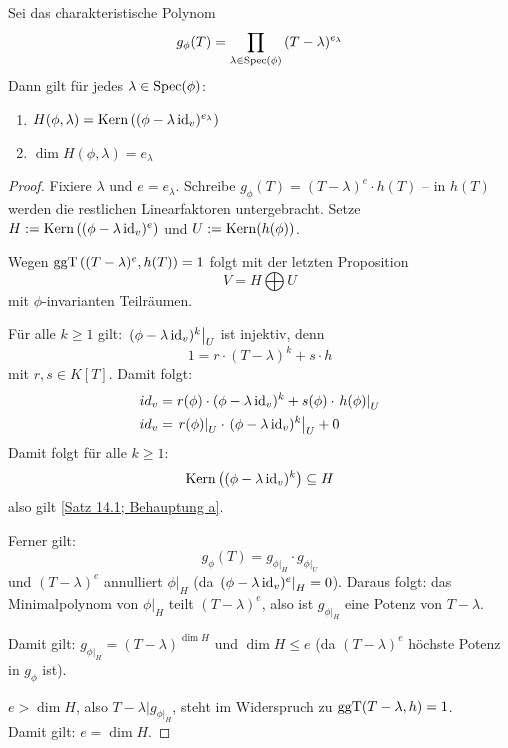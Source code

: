 \documentclass[parskip,a4paper,twoside,DIV15,BCOR12mm]{scrbook}
\begin{document}
\begin{theo}
\label{Satz 14.1}
Sei das charakteristische Polynom
\[
g_{\phi}(T)=\prod_{\lambda\in\operatorname{Spec}(\phi)}{(T-\lambda)^{e_{\lambda}}}
\]
Dann gilt für jedes \(\lambda\in\operatorname{Spec}(\phi)\):
\begin{enumerate}
\item \(H(\phi,\lambda)=\operatorname{Kern}\left((\phi-\lambda\operatorname{id}_{v})^{e_{\lambda}}\right)\)
\label{Satz 14.1; Behauptung a}
\item \(\dim H(\phi,\lambda)=e_{\lambda}\)
\end{enumerate}
\end{theo}
\begin{proof}
Fixiere \(\lambda\) und \(e=e_{\lambda}\). Schreibe 
\(g_{\phi}(T)=(T-\lambda)^{e}\cdot h(T)\) -- in \(h(T)\) werden die restlichen
Linearfaktoren untergebracht. Setze 
\(H:=\operatorname{Kern}\left((\phi-\lambda\operatorname{id}_{v})^{e}\right)\) und \(U:=\operatorname{Kern}(h(\phi))\).

Wegen \(\operatorname{ggT}\left((T-\lambda)^{e},h(T)\right)=1\) folgt mit der letzten 
Proposition %
\[
V=H\bigoplus U
\]
mit \(\phi\)-invarianten Teilräumen.

Für alle \(k\geq1\) gilt: \(\left.(\phi-\lambda\operatorname{id}_{v})^{k}\right|_{U}\) ist
injektiv, denn
\[
1=r\cdot(T-\lambda)^{k}+s\cdot h
\]
mit \(r,s\in K[T]\). Damit folgt:
\begin{align*}
id_{v}&=r(\phi)\cdot(\phi-\lambda\operatorname{id}_{v})^{k}+
	s(\phi)\cdot\left.h(\phi)\right|_{U}\\
id_{v}&=\left.r(\phi)\right|_{U}\cdot\left.(\phi-\lambda\operatorname{id}_{v})^{k}\right|_{U}+
	0
\end{align*}
Damit folgt für alle \(k\geq1\):
\[
\operatorname{Kern}\left((\phi-\lambda\operatorname{id}_{v})^{k}\right)\subseteq H
\]
also gilt \eqref{Satz 14.1; Behauptung a}.

Ferner gilt:
\[
g_{\phi}(T)=g_{\phi|_{H}}\cdot g_{\phi|_{U}}
\]
und \((T-\lambda)^{e}\) annulliert \(\phi|_{H}\) (da 
\(\left.(\phi-\lambda\operatorname{id}_{v})^{e}\right|_{H}=0\)). Daraus folgt: das 
Minimalpolynom von \(\phi|_{H}\) teilt \((T-\lambda)^{e}\), also ist 
\(g_{\phi|_{H}}\) eine Potenz von \(T-\lambda\).

Damit gilt: \(g_{\phi|_{H}}=(T-\lambda)^{\dim H}\) und \(\dim H\leq e\) (da
\((T-\lambda)^{e}\) höchste Potenz in \(g_{\phi}\) ist).

\(e>\dim H\), also \(T-\lambda\vert g_{\phi|_{H}}\), steht im Widerspruch zu
\(\operatorname{ggT}(T-\lambda,h)=1\).\\
Damit gilt: \(e=\dim H\).
\end{proof}
\end{document}
